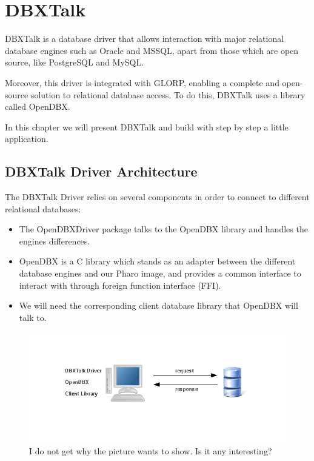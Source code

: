 \documentclass[a4paper,10pt,twoside]{book}
\begin{document}
\fi
\sloppy


\chapter{DBXTalk}
\chapterauthor{\authorguille{}}

DBXTalk is a database driver that allows interaction with major relational database engines such as
Oracle and MSSQL, apart from those which are open source, like PostgreSQL and MySQL.

Moreover, this driver is integrated with GLORP, enabling a complete and open-source
solution to relational database access.  To do this, DBXTalk uses a library called OpenDBX.

In this chapter we will present DBXTalk and build with step by step a little application.


\section{DBXTalk Driver Architecture}
The DBXTalk Driver relies on several components in order to connect to different relational databases:
\begin{itemize}
\item The OpenDBXDriver package talks to the OpenDBX library and handles the engines differences.
\item OpenDBX is a C library which stands as an adapter between the different database engines 
and our Pharo image, and provides a common interface to interact with through foreign function interface (FFI).
\item We will need the corresponding client database library that OpenDBX will talk to.
\end{itemize}

\begin{figure}
\begin{center}
\includegraphics[width=\linewidth]{dbx_architecture}
\caption{I do not get why the picture wants to show. Is it any interesting?}
\end{center}
\end{figure}
\end{document}
